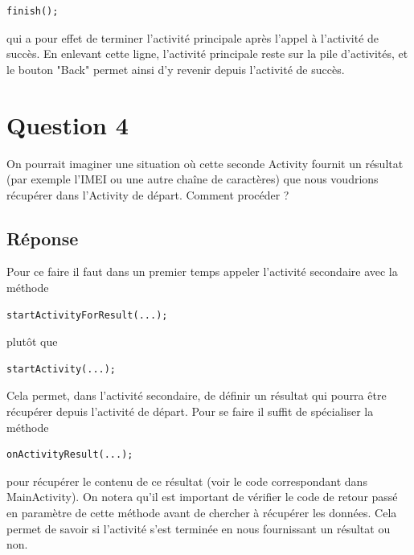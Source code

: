 \documentclass[francais,12pt]{article}
\begin{document}
		\begin{lstlisting}[style=javaCode]
		finish();
		\end{lstlisting}
		
		qui a pour effet de terminer l'activité principale après l'appel à l'activité de succès. En enlevant cette ligne, l'activité principale reste sur la pile d'activités, et le bouton "Back" permet ainsi d'y revenir depuis l'activité de succès.
		
		
	\section*{Question 4}
		 On pourrait imaginer une situation où cette seconde Activity fournit un résultat (par exemple l’IMEI ou une autre chaîne de caractères) que nous voudrions récupérer dans l'Activity de départ. Comment procéder ? 
		 
		 \subsection*{Réponse}
		 
		 Pour ce faire il faut dans un premier temps appeler l'activité secondaire avec la méthode 
		 
		 \begin{lstlisting}[style=javaCode]
		 startActivityForResult(...);
		 \end{lstlisting}
		 
		 plutôt que 
		 		 
		 \begin{lstlisting}[style=javaCode]
		 startActivity(...);
		 \end{lstlisting}
		 
		 Cela permet, dans l'activité secondaire, de définir un résultat qui pourra être récupérer depuis l'activité de départ. Pour se faire il suffit de spécialiser la méthode 
		 
		\begin{lstlisting}[style=javaCode]
		 onActivityResult(...);
		 \end{lstlisting}
		 
		 pour récupérer le contenu de ce résultat (voir le code correspondant dans MainActivity). On notera qu'il est important de vérifier le code de retour passé en paramètre de cette méthode avant de chercher à récupérer les données. Cela permet de savoir si l'activité s'est terminée en nous fournissant un résultat ou non.\newline
		 
\end{document}
